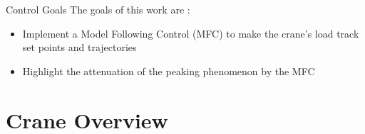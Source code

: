 \begin{frame}{Control Goals}
     The goals of this work are : 
    \begin{itemize}
        \item Implement a Model Following Control (MFC) to make the crane's load track set points and trajectories 
        \item Highlight the attenuation of the peaking phenomenon by the MFC
    \end{itemize}

\end{frame}


\section{Crane Overview}

